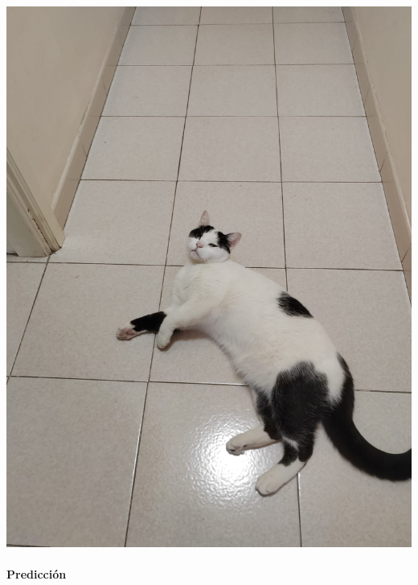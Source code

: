 \documentclass[11pt]{article}
\begin{document}
\begin{longtable}[]
\includegraphics{test_img/cat.jpg} \\
\end{longtable}

    \paragraph{Predicción}\label{predicciuxf3n}
    { \hspace*{\fill} \\}
\end{document}

